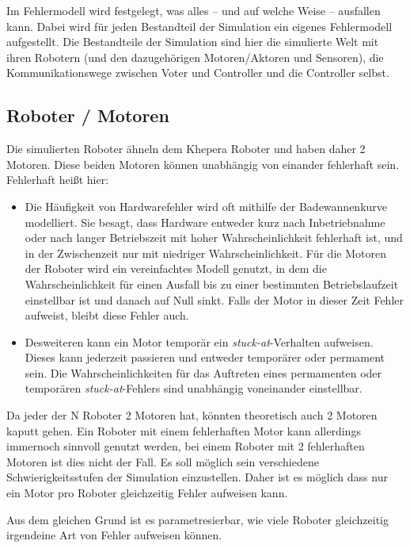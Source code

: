 Im Fehlermodell wird festgelegt, was alles -- und auf welche Weise -- ausfallen kann. Dabei wird f{\"{u}}r jeden Bestandteil der Simulation ein eigenes Fehlermodell aufgestellt. Die Bestandteile
der Simulation sind hier die simulierte Welt mit ihren Robotern (und den dazugeh{\"{o}}rigen Motoren/Aktoren
und Sensoren), die Kommunikationswege zwischen Voter und Controller und die Controller selbst.

\subsection{Roboter / Motoren}
Die simulierten Roboter {\"{a}}hneln dem Khepera Roboter und haben daher 2 Motoren. Diese beiden Motoren k{\"{o}}nnen unabh{\"{a}}ngig von einander fehlerhaft sein. Fehlerhaft
hei{\ss}t hier:
\begin{itemize}
	\item Die H{\"{a}}ufigkeit von Hardwarefehler wird oft mithilfe der Badewannenkurve modelliert. Sie besagt,
		dass Hardware entweder kurz nach Inbetriebnahme oder nach langer Betriebszeit mit hoher
		Wahrscheinlichkeit fehlerhaft ist, und in der Zwischenzeit nur mit niedriger Wahrscheinlichkeit.
		F{\"{u}}r die Motoren der Roboter wird ein vereinfachtes Modell genutzt, in dem die Wahrscheinlichkeit 
		f{\"{u}}r einen Ausfall bis zu einer bestimmten Betriebslaufzeit einstellbar ist und danach auf
		Null sinkt. Falls der Motor in dieser Zeit Fehler aufweist, bleibt diese Fehler auch.
	\item Desweiteren kann ein Motor tempor{\"{a}}r ein \textit{stuck-at}-Verhalten aufweisen. Dieses
		kann jederzeit passieren und entweder tempor{\"{a}}rer oder permament sein.
		Die Wahrscheinlichkeiten f{\"{u}}r das Auftreten eines permamenten oder tempor{\"{a}}ren
		\textit{stuck-at}-Fehlers sind unabh{\"{a}}ngig voneinander einstellbar.
\end{itemize}

Da jeder der \gls{N} Roboter 2 Motoren hat, k{\"{o}}nnten theoretisch auch 2 Motoren kaputt gehen. Ein Roboter mit einem fehlerhaften Motor kann allerdings immernoch sinnvoll genutzt werden,
bei einem Roboter mit 2 fehlerhaften Motoren ist dies nicht der Fall. Es soll m{\"{o}}glich sein verschiedene 
Schwierigkeitsstufen der Simulation einzustellen. Daher ist es m{\"{o}}glich
dass nur ein Motor pro Roboter gleichzeitig Fehler aufweisen kann.

Aus dem gleichen Grund ist es parametresierbar, wie viele Roboter gleichzeitig irgendeine Art von Fehler aufweisen k{\"{o}}nnen.


